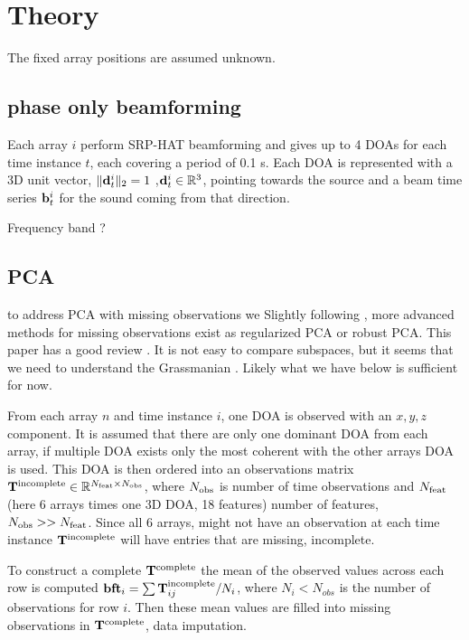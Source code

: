 \documentclass[journal]{IEEEtran}
\begin{document}
\section{Theory}
The fixed array positions are assumed unknown. 

\subsection{phase only beamforming}
Each array $i$ perform SRP-HAT beamforming \cite{grondin2019lightweight} and gives up to 4 DOAs for each time instance $t$, each covering a period of 0.1 s.
Each DOA is represented with a 3D unit vector, $\|{\bf d}_t^i\|_2=1$ ,${\bf d}_t^i\in {\mathbb R}^3$, pointing towards the source and a beam time series ${\bf b}_t^i$ for the sound coming from that direction.

Frequency band ?


\subsection{PCA}
to address PCA with missing observations we Slightly following \cite{zhang2019}, more advanced methods for missing observations exist as regularized PCA \cite{lounici2013} or robust PCA\cite{xu2010}. This paper has a good review \cite{chakraborty2020}. It is not easy to compare subspaces, but it seems that we need to understand the Grassmanian \cite{chakraborty2020}.
Likely what we have below is sufficient for now.


From each array $n$ and time instance $i$, one DOA is observed  with an $x, y, z$ component. It is assumed that there are only one dominant DOA from each array, if multiple DOA exists only the most coherent with the other arrays DOA is used. This DOA is then ordered into an  observations  matrix ${\bf T}^{\rm incomplete} \in \mathbb{R}^{N_{\rm feat}\times N_{\rm obs}}$, where $N_{\rm obs}$ is number of time observations and $N_{\rm feat}$ (here 6 arrays times one 3D DOA, 18 features) number of features, $N_{\rm obs}>> N_{\rm feat}$.
Since all 6 arrays, might not have an observation at each time instance ${\bf T}^{\rm incomplete}$ will have entries that are missing, incomplete.

To construct a complete ${\bf T}^{\rm complete}$ the mean of the observed values across each row is computed ${\bf bf t}_i=\sum {\bf T}^{\rm incomplete}_{ij}/N_i$, where $N_i<N_{obs}$ is the number of observations for row $i$.
Then these mean values are filled into missing observations in ${\bf T}^{\rm complete}$, data imputation. 
\end{document}
